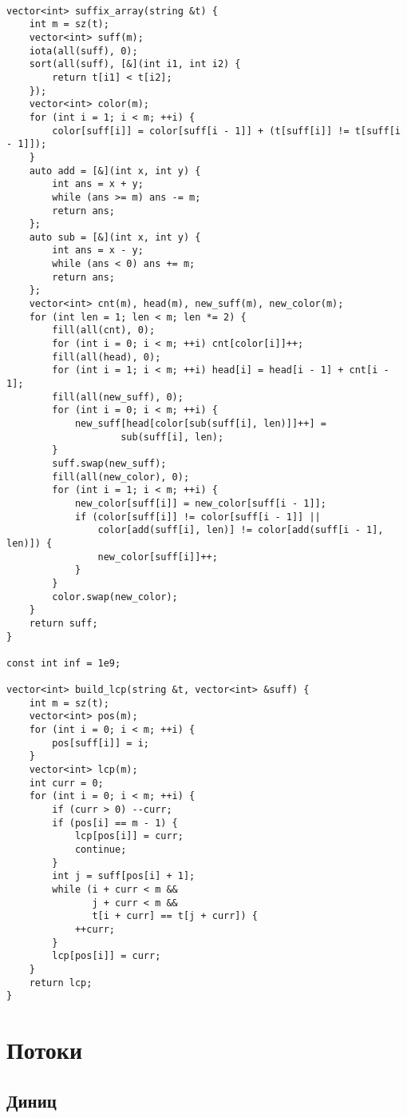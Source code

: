 \documentclass{article}
\begin{document}
    \begin{verbatim}

vector<int> suffix_array(string &t) {
    int m = sz(t);
    vector<int> suff(m);
    iota(all(suff), 0);
    sort(all(suff), [&](int i1, int i2) {
        return t[i1] < t[i2];
    });
    vector<int> color(m);
    for (int i = 1; i < m; ++i) {
        color[suff[i]] = color[suff[i - 1]] + (t[suff[i]] != t[suff[i - 1]]);
    }
    auto add = [&](int x, int y) {
        int ans = x + y;
        while (ans >= m) ans -= m;
        return ans;
    };
    auto sub = [&](int x, int y) {
        int ans = x - y;
        while (ans < 0) ans += m;
        return ans;
    };
    vector<int> cnt(m), head(m), new_suff(m), new_color(m);
    for (int len = 1; len < m; len *= 2) {
        fill(all(cnt), 0);
        for (int i = 0; i < m; ++i) cnt[color[i]]++;
        fill(all(head), 0);
        for (int i = 1; i < m; ++i) head[i] = head[i - 1] + cnt[i - 1];
        fill(all(new_suff), 0);
        for (int i = 0; i < m; ++i) {
            new_suff[head[color[sub(suff[i], len)]]++] =
                    sub(suff[i], len);
        }
        suff.swap(new_suff);
        fill(all(new_color), 0);
        for (int i = 1; i < m; ++i) {
            new_color[suff[i]] = new_color[suff[i - 1]];
            if (color[suff[i]] != color[suff[i - 1]] ||
                color[add(suff[i], len)] != color[add(suff[i - 1], len)]) {
                new_color[suff[i]]++;
            }
        }
        color.swap(new_color);
    }
    return suff;
}

const int inf = 1e9;

vector<int> build_lcp(string &t, vector<int> &suff) {
    int m = sz(t);
    vector<int> pos(m);
    for (int i = 0; i < m; ++i) {
        pos[suff[i]] = i;
    }
    vector<int> lcp(m);
    int curr = 0;
    for (int i = 0; i < m; ++i) {
        if (curr > 0) --curr;
        if (pos[i] == m - 1) {
            lcp[pos[i]] = curr;
            continue;
        }
        int j = suff[pos[i] + 1];
        while (i + curr < m &&
               j + curr < m &&
               t[i + curr] == t[j + curr]) {
            ++curr;
        }
        lcp[pos[i]] = curr;
    }
    return lcp;
}
    \end{verbatim}

    \section{Потоки}

    \subsection{Диниц}
\end{document}
